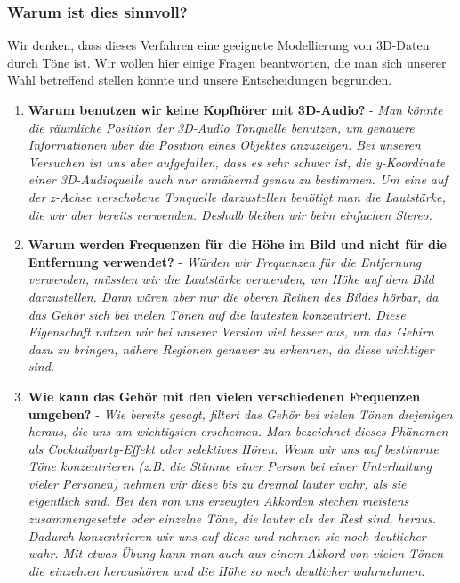 \documentclass[a4paper,12pt,ngerman]{scrartcl}
\begin{document}
\subsubsection{Warum ist dies sinnvoll?}

Wir denken, dass dieses Verfahren eine geeignete Modellierung von 3D-Daten durch Töne ist. Wir wollen hier einige 
Fragen beantworten, die man sich unserer Wahl betreffend stellen könnte und unsere Entscheidungen begründen.
\begin{enumerate}
	\item \textbf{Warum benutzen wir keine Kopfhörer mit 3D-Audio?} - \textit{Man könnte die
	räumliche Position der 3D-Audio Tonquelle benutzen, um genauere Informationen über die Position eines
	Objektes anzuzeigen. Bei unseren Versuchen ist uns aber aufgefallen, dass es sehr schwer ist, die y-Koordinate einer
	3D-Audioquelle auch nur annähernd genau zu bestimmen. Um eine auf der z-Achse verschobene Tonquelle 
	darzustellen benötigt man die Lautstärke, die wir aber bereits verwenden. Deshalb	bleiben wir beim einfachen Stereo.}
	\item \textbf{Warum werden Frequenzen für die Höhe im Bild und nicht für die Entfernung verwendet?} - \textit{Würden wir Frequenzen für die Entfernung verwenden, müssten wir die Lautstärke verwenden, um Höhe auf dem Bild darzustellen. Dann wären aber nur die oberen Reihen des Bildes 
	hörbar, da das Gehör sich bei vielen Tönen auf die lautesten konzentriert. Diese Eigenschaft nutzen wir bei 
	unserer Version viel besser aus, 
	um das Gehirn dazu zu bringen, nähere Regionen genauer zu erkennen, da diese wichtiger sind.}
	\item \textbf{Wie kann das Gehör mit den vielen verschiedenen Frequenzen umgehen?} - \textit{Wie bereits gesagt, filtert das 
	Gehör bei vielen Tönen diejenigen heraus, die uns am wichtigsten erscheinen. Man bezeichnet dieses Phänomen als Cocktailparty-Effekt 
	oder selektives Hören. Wenn wir uns auf bestimmte Töne konzentrieren (z.B. die Stimme einer Person bei einer Unterhaltung vieler
	Personen) nehmen wir diese bis zu dreimal lauter wahr, als sie eigentlich sind. Bei den von uns erzeugten Akkorden stechen meistens
	zusammengesetzte oder einzelne Töne, die lauter als der Rest sind, heraus. Dadurch konzentrieren wir uns auf diese und nehmen sie noch deutlicher wahr. Mit etwas Übung kann man auch aus einem Akkord von vielen Tönen 
	die einzelnen heraushören und die Höhe so noch deutlicher wahrnehmen.}
\end{enumerate}
\end{document}
